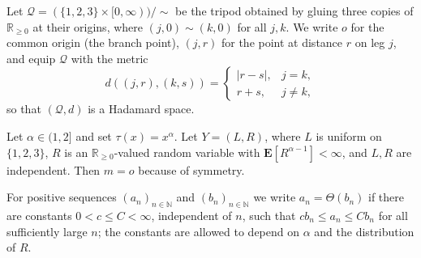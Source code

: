 \documentclass{article}
\newcommand*{\mc}[1]{\mathcal{#1}}
\newcommand{\N}{\mathbb{N}}
\newcommand{\R}{\mathbb{R}}
\newcommand{\Rp}{\R_{\geq0}}
\newcommand{\lb}{\left(} %
\newcommand{\rb}{\right)} %
\newcommand{\br}[1]{\lb #1 \rb} %
\newcommand{\brOf}[1]{\!\br{#1}} %
\newcommand{\E}{\mathbf{E}} %
\newcommand{\Eof}[1]{\E[#1]}
\newcommand{\tran}{\tau}
\begin{document}
\begin{example}
    \label{ex:tripod}
    Let $\mc Q = (\{1,2,3\}\times[0,\infty))/\sim$ be the tripod obtained by gluing three copies of $\Rp$ at their origins, where $(j,0)\sim(k,0)$ for all $j,k$. We write $o$ for the common origin (the branch point), $(j,r)$ for the point at distance $r$ on leg $j$, and equip $\mc Q$ with the metric
    \begin{equation}
        d\brOf{(j,r),(k,s)}
        =
        \begin{cases}
            |r-s|, & j=k,\\
            r+s,   & j\neq k ,
        \end{cases}
    \end{equation}
    so that $(\mc Q,d)$ is a Hadamard space.
    
    Let $\alpha\in(1,2]$ and set $\tran(x)=x^\alpha$.
    Let $Y=(L,R)$, where $L$ is uniform on $\{1,2,3\}$, $R$ is an $\Rp$-valued random variable with $\Eof{R^{\alpha-1}}<\infty$, and $L,R$ are independent.
    Then $m = o$ because of symmetry.
    
    For positive sequences $(a_n)_{n\in\N}$ and $(b_n)_{n\in\N}$ we write
    $a_n=\Theta(b_n)$ if there are constants $0<c\leq C<\infty$, independent of $n$, such
    that $c b_n\leq a_n\leq C b_n$ for all sufficiently large $n$; the constants are
    allowed to depend on $\alpha$ and the distribution of $R$.
    

\end{example}
\end{document}
